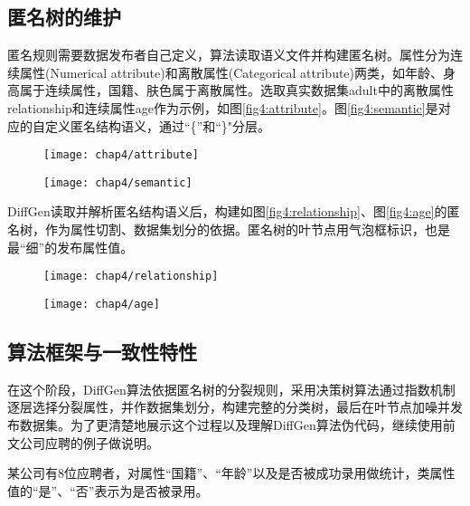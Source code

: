 \subsection{匿名树的维护}

匿名规则需要数据发布者自己定义，算法读取语义文件并构建匿名树。属性分为连续属性(Numerical attribute)和离散属性(Categorical attribute)两类，如年龄、身高属于连续属性，国籍、肤色属于离散属性。选取真实数据集adult\cite{adult}中的离散属性relationship和连续属性age作为示例，如图\ref{fig4:attribute}。图\ref{fig4:semantic}是对应的自定义匿名结构语义，通过“\{”和“\}"分层。

\begin{figure}[!htp]
	\centering
	\texttt{[image: chap4/attribute]}
\end{figure}


\begin{figure}[!htp]
	\centering
	\texttt{[image: chap4/semantic]}
\end{figure}

DiffGen读取并解析匿名结构语义后，构建如图\ref{fig4:relationship}、图\ref{fig4:age}的匿名树，作为属性切割、数据集划分的依据。匿名树的叶节点用气泡框标识，也是最“细”的发布属性值。

\begin{figure}[!htp]
	\centering
	\texttt{[image: chap4/relationship]}
\end{figure}

\begin{figure}[!htp]
	\centering
	\texttt{[image: chap4/age]}
\end{figure}

\subsection{算法框架与一致性特性}

在这个阶段，DiffGen算法依据匿名树的分裂规则，采用决策树算法通过指数机制逐层选择分裂属性，并作数据集划分，构建完整的分类树，最后在叶节点加噪并发布数据集。为了更清楚地展示这个过程以及理解DiffGen算法伪代码，继续使用前文公司应聘的例子做说明。
\begin{exmp}
	\label{chap4_exmp}
	某公司有8位应聘者，对属性“国籍”、“年龄”以及是否被成功录用做统计，类属性值的“是”、“否”表示为是否被录用。
\end{exmp}

